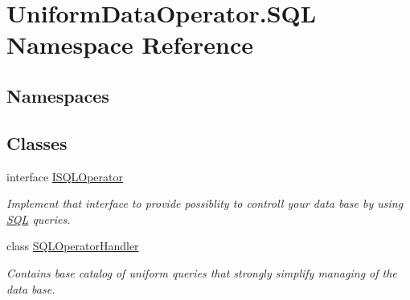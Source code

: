 \hypertarget{namespace_uniform_data_operator_1_1_s_q_l}{}\section{Uniform\+Data\+Operator.\+S\+QL Namespace Reference}
\label{namespace_uniform_data_operator_1_1_s_q_l}
\subsection*{Namespaces}
\begin{DoxyCompactItemize}
\end{DoxyCompactItemize}
\subsection*{Classes}
\begin{DoxyCompactItemize}
\item 
interface \mbox{\hyperlink{interface_uniform_data_operator_1_1_s_q_l_1_1_i_s_q_l_operator}{I\+S\+Q\+L\+Operator}}
\begin{DoxyCompactList}\small\item\em Implement that interface to provide possiblity to controll your data base by using \mbox{\hyperlink{namespace_uniform_data_operator_1_1_s_q_l}{S\+QL}} queries. \end{DoxyCompactList}\item 
class \mbox{\hyperlink{class_uniform_data_operator_1_1_s_q_l_1_1_s_q_l_operator_handler}{S\+Q\+L\+Operator\+Handler}}
\begin{DoxyCompactList}\small\item\em Contains base catalog of uniform queries that strongly simplify managing of the data base. \end{DoxyCompactList}\end{DoxyCompactItemize}
